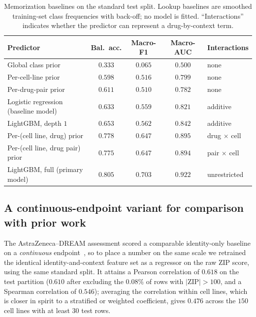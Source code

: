 \documentclass[11pt]{article}
\begin{document}
\begin{table}[H]
\centering
\caption{Memorization baselines on the standard test split. Lookup baselines are smoothed training-set
class frequencies with back-off; no model is fitted. ``Interactions'' indicates whether the predictor
can represent a drug-by-context term.}
\label{tab:baselines}
\small
\begin{tabular}{lcccl}
\toprule
Predictor & Bal.\ acc. & Macro-F1 & Macro-AUC & Interactions \\
\midrule
Global class prior                       & $0.333$ & $0.065$ & $0.500$ & none \\
Per-cell-line prior                      & $0.598$ & $0.516$ & $0.799$ & none \\
Per-drug-pair prior                      & $0.611$ & $0.510$ & $0.782$ & none \\
Logistic regression (baseline model)     & $0.633$ & $0.559$ & $0.821$ & additive \\
LightGBM, depth $1$                      & $0.653$ & $0.562$ & $0.842$ & additive \\
Per-(cell line, drug) prior              & $0.778$ & $0.647$ & $0.895$ & drug $\times$ cell \\
Per-(cell line, drug pair) prior         & $0.775$ & $0.647$ & $0.894$ & pair $\times$ cell \\
LightGBM, full (primary model)           & $\mathbf{0.805}$ & $\mathbf{0.703}$ & $\mathbf{0.922}$ & unrestricted \\
\bottomrule
\end{tabular}
\end{table}

\subsection{A continuous-endpoint variant for comparison with prior work}
The AstraZeneca--DREAM assessment scored a comparable identity-only baseline on a \emph{continuous}
endpoint~\cite{menden2019}, so to place a number on the same scale we retrained the identical
identity-and-context feature set as a regressor on the raw ZIP score, using the same standard split.
It attains a Pearson correlation of $0.618$ on the test partition ($0.610$ after excluding the
$0.08\%$ of rows with $|$ZIP$| > 100$, and a Spearman correlation of $0.546$); averaging the
correlation within cell lines, which is closer in spirit to a stratified or weighted coefficient, gives
$0.476$ across the $150$ cell lines with at least $30$ test rows.
\end{document}

